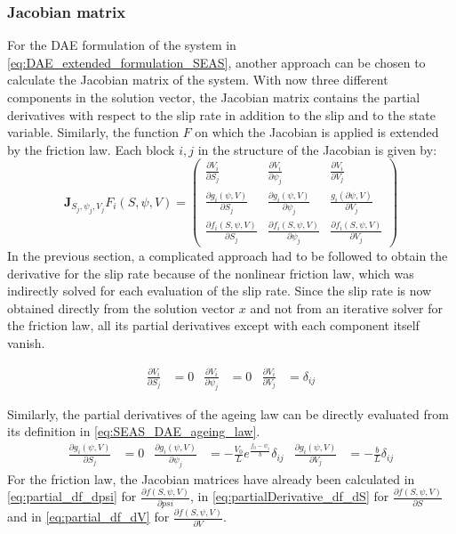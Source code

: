 \subsubsection{Jacobian matrix}
\label{sssec:Jacobian_DAE}
For the DAE formulation of the system in \autoref{eq:DAE_extended_formulation_SEAS}, another approach can be chosen to calculate the Jacobian matrix of the system. With now three different components in the solution vector, the Jacobian matrix contains the partial derivatives with respect to the slip rate in addition to the slip and to the state variable. Similarly, the function $F$ on which the Jacobian is applied is extended by the friction law. Each block $i,j$ in the structure of the Jacobian is given by:
\begin{equation}
\label{eq:Jacobian_DAE_formulation}
\mathbf{J}_{S_j,\psi_j,V_j}F_i(S,\psi,V) = 	\begin{pmatrix}
\frac{\partial V_i}{\partial S_j} & \frac{\partial V_i}{\partial \psi_j} & \frac{\partial V_i}{\partial V_j} \\
\frac{\partial g_i(\psi,V)}{\partial S_j} & \frac{\partial g_i(\psi,V)}{\partial \psi_j} & \frac{g_i(\partial \psi,V)}{\partial V_j} \\
\frac{\partial f_i(S,\psi,V)}{\partial S_j} & \frac{\partial f_i(S,\psi,V)}{\partial \psi_j} & \frac{\partial f_i(S,\psi,V)}{\partial V_j}
\end{pmatrix}
\end{equation}
In the previous section, a complicated approach had to be followed to obtain the derivative for the slip rate because of the nonlinear friction law, which was indirectly solved for each evaluation of the slip rate. Since the slip rate is now obtained directly from the solution vector $x$ and not from an iterative solver for the friction law, all its partial derivatives except with each component itself vanish. 

\begin{align}	
\frac{\partial V_i}{\partial S_j} &= 0 & \frac{\partial V_i}{\partial \psi_j} &= 0 & \frac{\partial V_i}{\partial V_j} &= \delta_{ij}
\end{align}

Similarly, the partial derivatives of the ageing law can be directly evaluated from its definition in \autoref{eq:SEAS_DAE_ageing_law}.
\begin{align}
\frac{\partial g_i(\psi,V)}{\partial S_j} &=  0 &
\frac{\partial g_i(\psi,V)}{\partial\psi_j} &= -\frac{V_0}{L}e^{\frac{f_0-\psi_i}{b}}\delta_{ij} &	
\frac{\partial g_i(\psi,V)}{\partial V_j} &= -\frac{b}{L} \delta_{ij}
\end{align}
For the friction law, the Jacobian matrices have already been calculated in \autoref{eq:partial_df_dpsi} for $\frac{\partial f(S,\psi,V)}{\partial psi}$, in \autoref{eq:partialDerivative_df_dS} for $\frac{\partial f(S,\psi,V)}{\partial S}$ and in \autoref{eq:partial_df_dV} for $\frac{\partial f(S,\psi,V)}{\partial V}$.

